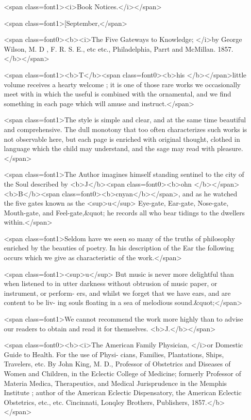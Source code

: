 <span class=font1><i>Book Notices.</i></span>

<span class=font1>[September,</span>

<span class=font0><b><i>The Five Gateways to Knowledge; </i>by George Wilson, M. D , F. R. S. E., etc etc.,
Philadelphia, Parrt and McMillan. 1857.</b></span>

<span class=font1><b>T</b><span class=font0><b>his </b></span>little volume receives a hearty welcome ; it is one of those rare
works we occasionally meet with in which the useful is combined
with the ornamental, and we find something in each page which will
amuse and instruct.</span>

<span class=font1>The style is simple and clear, and at the same time beautiful and
comprehensive. The dull monotony that too often characterizes such
works is not observable here, but each page is enriched with original
thought, clothed in language which the child may understand, and the
sage may read with pleasure.</span>

<span class=font1>The Author imagines himself standing sentinel to the city of the Soul
described by <b>J</b><span class=font0><b>ohn </b></span><b>B</b><span class=font0><b>cnyan</b></span>, and as he watched the five gates known
as the <sup>u</sup> Eye-gate, Ear-gate, Nose-gate, Mouth-gate, and Feel-gate,&quot; he
records all who bear tidings to the dwellers within.</span>

<span class=font1>Seldom have we seen so many of the truths of philosophy enriched
by the beauties of poetry. In his description of the Ear the following
occurs which we give as characteristic of the work.</span>

<span class=font1><sup>u</sup> But music is never more delightful than when listened to in utter
darkness without obtrusion of music paper, or instrument, or perform-
ers, and whilst we forget that we have ears, and are content to be liv-
ing souls floating in a sea of melodious sound.&quot;</span>

<span class=font1>We cannot recommend the work more highly than to advise our readers
to obtain and read it for themselves. <b>J.</b></span>

<span class=font0><b><i>The American Family Physician, </i>or Domestic Guide to Health. For the use of Physi-
cians, Families, Plantations, Ships, Travelers, etc. By John King, M. D., Professor of
Obstetrics and Diseases of Women and Children, in the Eclectic College of Medicine;
formerly Professor of Materia Medica, Therapeutics, and Medical Jurisprudence in the
Memphis Institute ; author of the American Eclectic Dispensatory, the American
Eclectic Obstetrics, etc., etc. Cincinnati, Lonqley Brothers, Publishers, 1857.</b></span>

